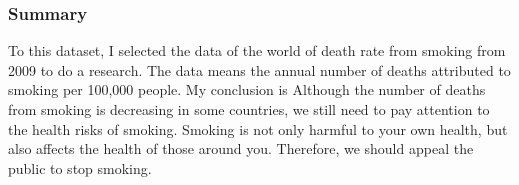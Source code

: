 \documentclass[
]{article}
\begin{document}
\hypertarget{summary}{%
\subsubsection{Summary}\label{summary}}

To this dataset, I selected the data of the world of death rate from
smoking from 2009 to do a research. The data means the annual number of
deaths attributed to smoking per 100,000 people. My conclusion is
Although the number of deaths from smoking is decreasing in some
countries, we still need to pay attention to the health risks of
smoking. Smoking is not only harmful to your own health, but also
affects the health of those around you. Therefore, we should appeal the
public to stop smoking.
\end{document}
